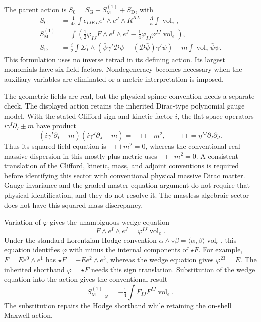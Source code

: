 The parent action is $S_0=S_{\mathrm G}+S_{\mathrm M}^{(1)}+S_{\mathrm D}$, with
\begin{align}
 S_{\mathrm G}
 &=\frac1{4\kappa}\int\epsilon_{IJKL}e^I\wedge e^J\wedge R^{KL}
                  -\frac\Lambda\kappa\int\operatorname{vol}_e,\\
 S_{\mathrm M}^{(1)}
 &=\int\left(\tfrac12\varphi_{IJ}F\wedge e^I\wedge e^J
                    -\tfrac14\varphi_{IJ}\varphi^{IJ}\operatorname{vol}_e\right),\\
 S_{\mathrm D}
 &=\frac i2\int\Sigma_I\wedge
       \left(\bar\psi\gamma^I\mathcal D\psi
               -(\mathcal D\bar\psi)\gamma^I\psi\right)
       -m\int\operatorname{vol}_e\bar\psi\psi.
 \label{c:constraints:parent-action}
\end{align}
This formulation uses no inverse tetrad in its defining action. Its largest monomials have six field factors. Nondegeneracy becomes necessary when the auxiliary variables are eliminated or a metric interpretation is imposed.

The geometric fields are real, but the physical spinor convention needs a separate check. The displayed action retains the inherited Dirac-type polynomial gauge model. With the stated Clifford sign and kinetic factor $i$, the flat-space operators $i\gamma^I\partial_I\pm m$ have product
\begin{equation}
 (i\gamma^I\partial_I+m)(i\gamma^J\partial_J-m)
       =-\Box-m^2,
 \qquad \Box=\eta^{IJ}\partial_I\partial_J.
\end{equation}
Thus its squared field equation is $\Box+m^2=0$, whereas the conventional real massive dispersion in this mostly-plus metric uses $\Box-m^2=0$. A consistent translation of the Clifford, kinetic, mass, and adjoint conventions is required before identifying this sector with conventional physical massive Dirac matter. Gauge invariance and the graded master-equation argument do not require that physical identification, and they do not resolve it. The massless algebraic sector does not have this squared-mass discrepancy.

Variation of $\varphi$ gives the unambiguous wedge equation
\begin{equation}
 F\wedge e^I\wedge e^J=\varphi^{IJ}\operatorname{vol}_e.
 \label{c:constraints:maxwell-auxiliary}
\end{equation}
Under the standard Lorentzian Hodge convention
$\alpha\wedge\star\beta=\langle\alpha,\beta\rangle\operatorname{vol}_e$,
this equation identifies $\varphi$ with minus the internal components of $\star F$. For example, $F=E e^0\wedge e^1$ has
$\star F=-E e^2\wedge e^3$, whereas the wedge equation gives $\varphi^{23}=E$. The inherited shorthand $\varphi=\star F$ needs this sign translation. Substitution of the wedge equation into the action gives the conventional result
\begin{equation}
 S_{\mathrm M}^{(1)}\big|_{\varphi}
      =-\tfrac14\int F_{IJ}F^{IJ}\operatorname{vol}_e.
\end{equation}
The substitution repairs the Hodge shorthand while retaining the on-shell Maxwell action.

